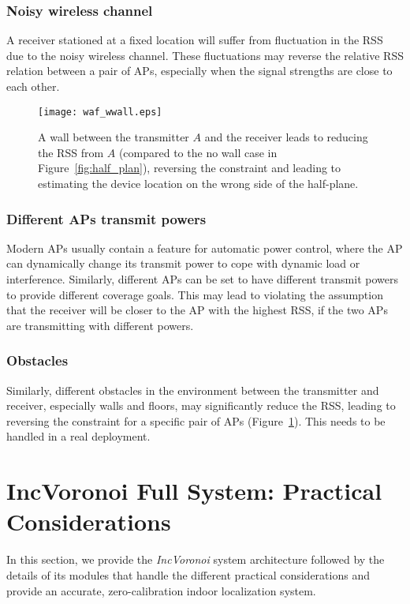 \documentclass[conference]{IEEEtran}
\def \sys {\textit{IncVoronoi}}
\begin{document}
\subsubsection{Noisy wireless channel}
A receiver stationed at a fixed location will suffer from fluctuation in the RSS due to the noisy wireless channel. These fluctuations may reverse the relative RSS relation between a pair of APs, especially when the signal strengths are close to each other.
\begin{figure}[!t]
    \texttt{[image: waf\_wwall.eps]}
\caption{A wall between the transmitter $A$ and the receiver leads to reducing the RSS from $A$ (compared to the no wall case in Figure~\ref{fig:half_plan}), reversing the constraint and leading to estimating the device location on the wrong side of the half-plane.}
\label{fig:waf_effect}
\end{figure}
\subsubsection{Different APs transmit powers} 

Modern APs usually contain a feature for automatic power control, where the AP can dynamically change its transmit power to cope with dynamic load or interference. Similarly, different APs can be set to have different transmit powers to provide different coverage goals. This may lead to violating the assumption that the receiver will be closer to the AP with the highest RSS, if the two APs are transmitting with different powers.

\subsubsection{Obstacles}
Similarly, different obstacles in the environment between the transmitter and receiver, especially walls and floors, may significantly reduce the RSS, leading to reversing the constraint for a specific pair of APs (Figure~\ref{fig:waf_effect}). This needs to be handled in a real deployment.

\section{IncVoronoi Full System: Practical Considerations}
\label{sec:system}
In this section, we provide the \sys{} system architecture followed by the details of its modules that handle the different practical considerations and provide an accurate, zero-calibration indoor localization system. 
\end{document}
